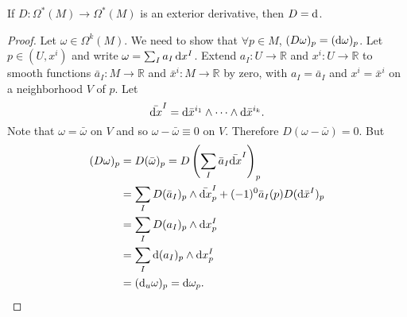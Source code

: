\begin{prop}[Uniquenss of $D$]
If $D: \Omega^\ast(M) \to \Omega^\ast(M)$ is an exterior derivative,
then $D = \mathop{}\!\mathrm{d}$.
\end{prop}
\begin{proof}
Let $\omega \in \Omega^k(M)$. We need to show that $\forall p \in M$,
$(D\omega)_p = (\mathop{}\!\mathrm{d}\omega)_p$. Let
$p \in (U, x^i)$ and write $\omega = \sum_I a_I \mathop{}\!\mathrm{d} x^I$.
Extend $a_I : U \to \mathbb{R}$ and $x^i : U \to \mathbb{R}$ to smooth
functions $\bar{a}_I : M \to \mathbb{R}$ and $\bar{x}^i: M \to
\mathbb{R}$ by zero, with $a_I = \bar{a}_I$ and $x^i = \bar{x}^i$ on a
neighborhood $V$ of $p$. Let
$$
  \bar{\mathop{}\!\mathrm{d} x}^I
= \mathop{}\!\mathrm{d} \bar{x}^{i_1} \wedge \cdots \wedge \mathop{}\!\mathrm{d} \bar{x}^{i_k}.
$$
Note that $\omega = \bar{\omega}$ on $V$ and so
$\omega - \bar{\omega} \equiv 0$ on $V$. Therefore $D(\omega -
\bar{\omega}) = 0$. But
\begin{align*}
   (D \omega)_p
&= D(\bar{\omega})_p
 = D\left(
     \sum_I
       \bar{a}_I \bar{\dif x}^I
   \right)_p \\
&= \sum_I D(\bar{a}_I)_p \wedge \bar{\dif x}^I_p
 + (-1)^0 \bar{a}_I(p) D(\dif \bar{x}^I)_p \\
&= \sum_I
     D(a_I)_p \wedge \dif x^I_p \\
&= \sum_I
     \dif(a_I)_p \wedge \dif x^I_p \\
&= (\dif_u \omega)_p
 = \dif \omega_p.
\end{align*}
\end{proof}
